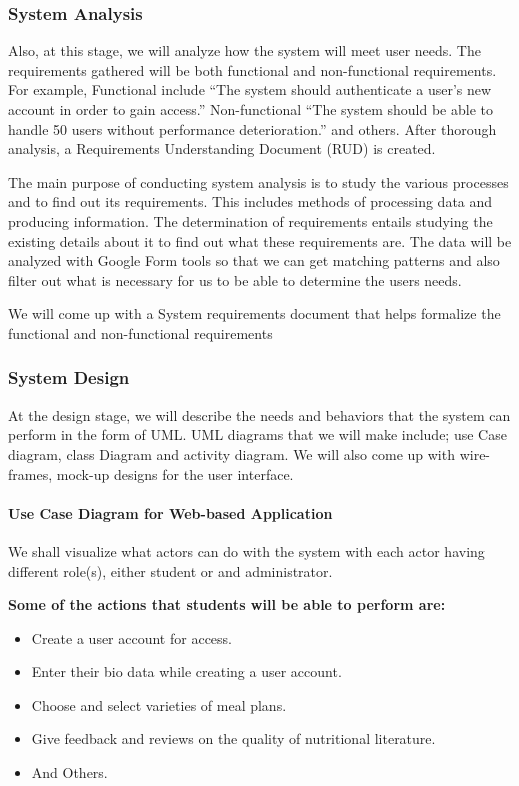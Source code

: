 \documentclass{article}
\begin{document}
\subsubsection{System Analysis}
Also, at this stage, we will analyze how the system will meet user needs. The requirements gathered will be both functional and non-functional requirements. For example, Functional include “The system should authenticate a user’s new account in order to gain access.” Non-functional “The system should be able to handle 50 users without performance deterioration.” and others. After thorough analysis, a Requirements Understanding Document (RUD) is created.

The main purpose of conducting system analysis is to study the various processes and to find out its requirements. This includes methods of processing data and producing information. The determination of requirements entails studying the existing details about it to find out what these requirements are. The data will be analyzed with Google Form tools so that we can get matching patterns and also filter out what is necessary for us to be able to determine the users needs.

We will come up with a System requirements document that helps formalize the functional and non-functional requirements

\subsubsection{System Design}
At the design stage, we will describe the needs and behaviors that the system can perform in the form of UML. UML diagrams that we will make include; use Case diagram, class Diagram and activity diagram. We will also come up with wire-frames, mock-up designs for the user interface.

\paragraph{Use Case Diagram for Web-based Application \\}
We shall visualize what actors can do with the system with each actor having different role(s), either student or and administrator.

\textbf{Some of the actions that students will be able to perform are:}
\begin{itemize}
\item Create a user account for access.
\item Enter their bio data while creating a user account.
\item Choose and select varieties of meal plans.
\item Give feedback and reviews on the quality of nutritional literature.
\item And Others.
\end{itemize}
\end{document}
